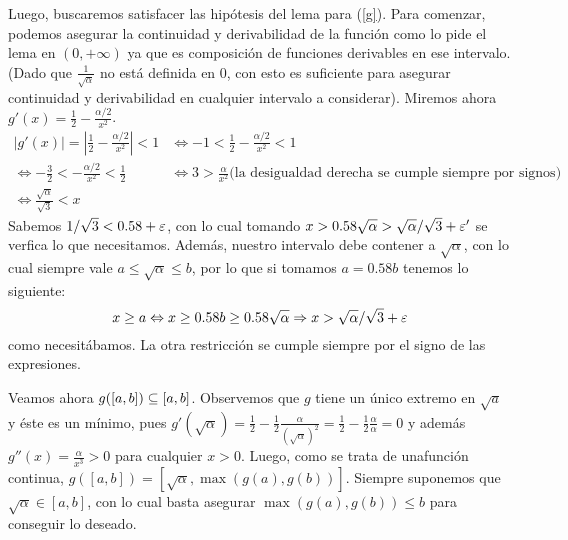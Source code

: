 Luego, buscaremos satisfacer las hipótesis del lema para (\ref{g}). Para comenzar, podemos asegurar la continuidad y derivabilidad de la función como lo pide el lema en $(0, +\infty)$ ya que es composición de funciones derivables en ese intervalo. (Dado que $\frac{1}{\sqrt{\alpha}}$ no está definida en 0, con esto es suficiente para asegurar continuidad y derivabilidad en cualquier intervalo a considerar). Miremos ahora $ g'(x) = \frac{1}{2} - \frac{\alpha/2}{x^2}$.\\
$\begin{array}{rl}
	 |g'(x)| = |\frac{1}{2} - \frac{\alpha/2}{x^2}|  < 1 & \Leftrightarrow  -1 < \frac{1}{2} - \frac{\alpha/2}{x^2} < 1\nonumber \\
	\Leftrightarrow  -\frac{3}{2} <  - \frac{\alpha/2}{x^2}  < \frac{1}{2} & \Leftrightarrow 
		3 >  \frac{\alpha}{x^2}  \text{(la desigualdad derecha se cumple siempre por signos)} \nonumber \\
	\Leftrightarrow  \frac{\sqrt{\alpha}}{\sqrt{3}} < x \nonumber
\end{array}$\\
Sabemos $1/\sqrt{3} < 0.58 + \varepsilon$, con lo cual tomando $x > 0.58\sqrt{\alpha} > \sqrt{\alpha}/\sqrt{3} + \varepsilon'$ se verfica lo que necesitamos. Además, nuestro intervalo debe contener a $\sqrt{\alpha}$, con lo cual siempre vale $a \leq \sqrt{\alpha} \leq b$, por lo que si tomamos $a = 0.58b$ tenemos lo siguiente:
$$x \geq a \Leftrightarrow x \geq 0.58b \geq 0.58\sqrt{\alpha} \Rightarrow x > \sqrt{\alpha}/\sqrt{3} + \varepsilon$$ 
como necesitábamos. La otra restricción se cumple siempre por el signo de las expresiones.

Veamos ahora $g([a,b]) \subseteq [a,b]$. Observemos que $g$ tiene un único extremo en $\sqrt{a}$ y éste es un mínimo, pues $g'(\sqrt{\alpha}) = \frac{1}{2} - \frac{1}{2}\frac{\alpha}{(\sqrt{\alpha})^2} = \frac{1}{2} - \frac{1}{2}\frac{\alpha}{\alpha} = 0$ y además $g''(x) = \frac{\alpha}{x^3} >0$ para cualquier $x>0$. Luego, como se trata de unafunción continua, $g([a,b]) = [\sqrt{\alpha}, \max(g(a), g(b))]$. Siempre suponemos que $\sqrt{\alpha}\in[a,b]$, con lo cual basta asegurar $\max(g(a), g(b))\leq b$ para conseguir lo deseado.

